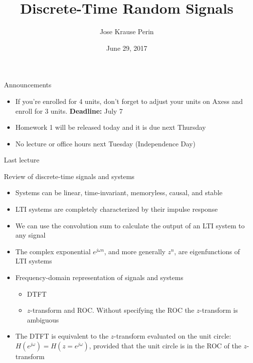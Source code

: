 \documentclass[10pt]{beamer}
\title[EE 264]{Discrete-Time Random Signals}
\author{Jose Krause Perin}
\institute{Stanford University}
\date{June 29, 2017}
\begin{document}
\begin{frame}
  \titlepage
\end{frame}


\begin{frame}{Announcements}

\begin{itemize}
	\item If you're enrolled for 4 units, don't forget to adjust your units on Axess and enroll for 3 units. \textbf{Deadline:} July 7
	\item Homework 1 will be released today and it is due next Thursday
	\item No lecture or office hours next Tuesday (Independence Day)
\end{itemize}

\end{frame}

\begin{frame}{Last lecture}

\begin{block}{Review of discrete-time signals and systems}
	\begin{itemize}
		\item Systems can be linear, time-invariant, memoryless, causal, and stable \\
		\item LTI systems are completely characterized by their impulse response \\
		\item We can use the convolution sum to calculate the output of an LTI system to any signal \\
		\item The complex exponential $e^{j\omega n}$, and more generally $z^n$, are eigenfunctions of LTI systems
		\item Frequency-domain representation of signals and systems
		\begin{itemize}\normalsize
			\item DTFT
			\item $z$-transform and ROC. Without specifying the ROC the $z$-transform is ambiguous
		\end{itemize}
		\item The DTFT is equivalent to the $z$-transform evaluated on the unit circle: $H(e^{j\omega}) = H(z = e^{j\omega})$, provided that the unit circle is in the ROC of the $z$-transform
	\end{itemize}
\end{block}

\end{frame}
\end{document}
